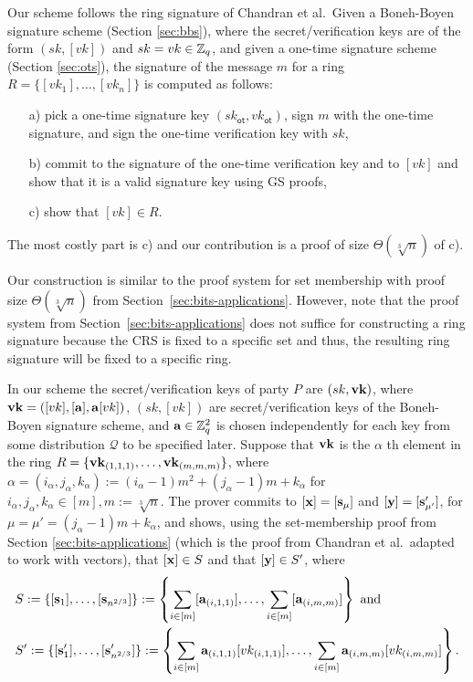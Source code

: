 Our scheme follows the ring signature of Chandran et al.~Given a {Boneh-Boyen signature scheme} (Section \ref{sec:bbs}), where the secret/verification keys are of the form $(sk,[vk])$ and $sk=vk\in\mathbb{Z}_q$, and given a {one-time signature scheme} (Section \ref{sec:ots}), the signature of the message $m$ for a ring $R=\{[vk_1],\ldots,[vk_n]\}$ is computed as follows:
\begin{itemize}
\item[a)] pick a one-time signature key $(sk_\mathsf{ot},vk_\mathsf{ot})$, sign $m$ with the one-time signature, and sign the one-time verification key with $sk$,
\item[b)] commit to the signature of the one-time verification key and to $[vk]$ and show that it is a valid signature key using GS proofs,
\item[c)] show that $[vk]\in R$.
\end{itemize}
The most costly part is c) and our contribution is a proof of size $\Theta(\sqrt[3]{n})$ of c).

Our construction is similar to the proof system for set membership with proof size $\Theta(\sqrt[3]{n})$ from Section~\ref{sec:bits-applications}. However, note that the proof system from Section~\ref{sec:bits-applications} does not suffice for constructing a ring signature because the CRS is fixed to a specific set and thus, the resulting ring signature will be fixed to a specific ring. 

In our scheme the secret/verification keys of party $P$ are $(sk,\mathbf{vk})$, where $\mathbf{vk}=([vk],[\mathbf{a}],\mathbf{a}[vk])$, $(sk,[vk])$ are secret/verification keys of the Boneh-Boyen signature scheme, and $\mathbf{a}\in\mathbb{Z}_q^2$ is chosen independently for each key from some distribution $\mathcal{Q}$ to be specified later. Suppose that $\mathbf{vk}$ is the $\alpha$ th element in the ring $R=\{\mathbf{vk}_{(1,1,1)},\ldots,\mathbf{vk}_{(m,m,m)}\}$, where $\alpha=(i_\alpha,j_\alpha,k_\alpha):=(i_\alpha-1)m^2+(j_\alpha-1)m+k_\alpha$ for $i_\alpha,j_\alpha,k_\alpha\in[m],m:=\sqrt[3]{n}$. The prover commits to $[\mathbf{x}]=[\mathbf{s}_\mu]$ and $[\mathbf{y}]=[\mathbf{s}'_{\mu'}]$, for $\mu=\mu'=(j_\alpha-1)m+k_\alpha$, and shows, using the set-membership proof from Section \ref{sec:bits-applications} (which is the proof from Chandran et al.~adapted to work with vectors), that $[\mathbf{x}]\in S$ and that $[\mathbf{y}]\in S'$, 
where
\begin{align*}
&S:=\{[\mathbf{s}_1],\ldots,[\mathbf{s}_{n^{2/3}}]\}:=\left\{\sum_{i\in[m]}[\mathbf{a}_{(i,1,1)}],\ldots,\sum_{i\in[m]}[\mathbf{a}_{(i,m,m)}]\right\}\text{ and }\\
&S':=\{[\mathbf{s}'_1],\ldots,[\mathbf{s}'_{n^{2/3}}]\}:=\left\{\sum_{i\in[m]}\mathbf{a}_{(i,1,1)}[vk_{(i,1,1)}],\ldots,\sum_{i\in[m]}\mathbf{a}_{(i,m,m)}[vk_{(i,m,m)}]\right\}.
\end{align*}

